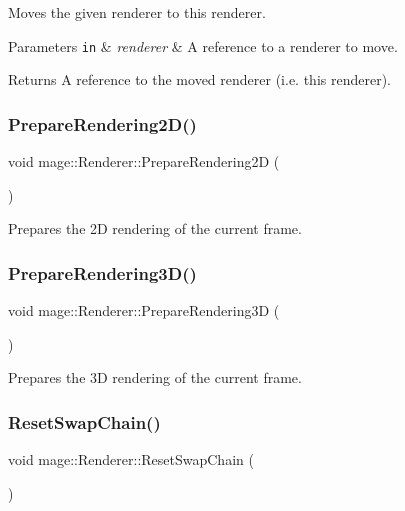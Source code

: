 Moves the given renderer to this renderer.


\begin{DoxyParams}[1]{Parameters}
\mbox{\tt in}  & {\em renderer} & A reference to a renderer to move. \\
\hline
\end{DoxyParams}
\begin{DoxyReturn}{Returns}
A reference to the moved renderer (i.\+e. this renderer). 
\end{DoxyReturn}
\hypertarget{classmage_1_1_renderer_a716c5ef70f425269de95db07c9ecdbfa}{}\label{classmage_1_1_renderer_a716c5ef70f425269de95db07c9ecdbfa} 
\subsubsection{\texorpdfstring{Prepare\+Rendering2\+D()}{PrepareRendering2D()}}
{\footnotesize\ttfamily void mage\+::\+Renderer\+::\+Prepare\+Rendering2D (\begin{DoxyParamCaption}{ }\end{DoxyParamCaption})}

Prepares the 2D rendering of the current frame. \hypertarget{classmage_1_1_renderer_a9c76ba66a275c0d74f250955e7781f77}{}\label{classmage_1_1_renderer_a9c76ba66a275c0d74f250955e7781f77} 
\subsubsection{\texorpdfstring{Prepare\+Rendering3\+D()}{PrepareRendering3D()}}
{\footnotesize\ttfamily void mage\+::\+Renderer\+::\+Prepare\+Rendering3D (\begin{DoxyParamCaption}{ }\end{DoxyParamCaption})}

Prepares the 3D rendering of the current frame. \hypertarget{classmage_1_1_renderer_a1c4615559503b339a9cdc6ac17e1e858}{}\label{classmage_1_1_renderer_a1c4615559503b339a9cdc6ac17e1e858} 
\subsubsection{\texorpdfstring{Reset\+Swap\+Chain()}{ResetSwapChain()}}
{\footnotesize\ttfamily void mage\+::\+Renderer\+::\+Reset\+Swap\+Chain (\begin{DoxyParamCaption}{ }\end{DoxyParamCaption})\hspace{0.3cm}{\ttfamily [private]}}

